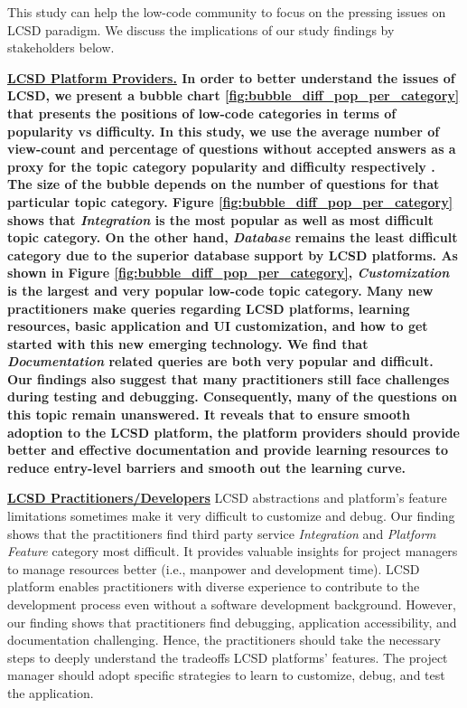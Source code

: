 
This study can help the low-code community to focus on the pressing issues on
LCSD paradigm. We discuss the implications of our study findings by stakeholders below.

\bf{\ul{ LCSD Platform Providers.}} 
In order to better understand the issues of LCSD, we present a bubble chart \ref{fig:bubble_diff_pop_per_category} that presents the positions
of low-code categories in terms of popularity vs difficulty. In this study, we
use the average number of view-count and percentage of questions without accepted
answers as a proxy for the topic category popularity and difficulty
respectively \cite{abdellatif2020challenges}. The size of the bubble depends on
the number of questions for that particular topic category.
Figure \ref{fig:bubble_diff_pop_per_category} shows that \textit{Integration} is
the most popular as well as most difficult topic category. On the other hand,
\textit{Database} remains the least difficult category due to the superior database support by  LCSD platforms. As shown in Figure \ref{fig:bubble_diff_pop_per_category},
\textit{Customization} is the largest and very popular low-code topic category.
Many new practitioners make queries regarding LCSD platforms,
learning resources, basic application and UI customization, and how to get
started with this new emerging technology. We find that \textit{Documentation}
related queries are both very popular and difficult. Our
findings also suggest that many practitioners still face challenges during testing and debugging. Consequently, many of
the questions on this topic remain unanswered. It reveals that to ensure smooth adoption to the LCSD platform, the platform providers should provide better and effective documentation and provide learning resources to reduce entry-level barriers and smooth out the learning curve. 

\textbf{\ul{ LCSD Practitioners/Developers}} LCSD abstractions and platform's
feature limitations sometimes make it very difficult to customize and debug. Our
finding shows that the practitioners find third party service \textit{Integration}
and \textit{Platform Feature} category most difficult. It provides valuable
insights for project managers to manage resources better (i.e., manpower and
development time). 
LCSD platform enables practitioners with diverse experience to contribute to the development process even without a software development
background. However, our finding shows that practitioners find debugging, application
accessibility, and documentation challenging. Hence, the practitioners should take
the necessary steps to deeply understand the tradeoffs LCSD platforms' features. The project manager should adopt specific strategies to learn to customize, debug, and test the application.


